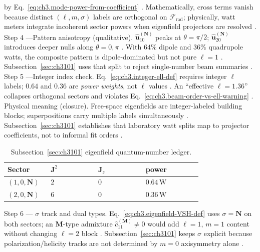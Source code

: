 by Eq.~\eqref{eq:ch3.mode-power-from-coefficient} \cite{poynting1884}. Mathematically, cross terms vanish
because distinct \((\ell,m,\sigma)\) labels are orthogonal on \(\mathcal{F}_{\mathrm{rad}}\); physically, watt meters integrate
incoherent sector powers when eigenfield projectors are resolved \cite{hansen1988}.
Step 4 ---Pattern anisotropy (qualitative). \(\widehat{\mathbf{u}}_{10}^{(\mathbf{N})}\) peaks at \(\theta=\pi/2\); \(\widehat{\mathbf{u}}_{20}^{(\mathbf{N})}\) introduces
deeper nulls along \(\theta=0,\pi\) \cite{jackson1999}. With \(64\%\) dipole and \(36\%\) quadrupole watts, the composite
pattern is dipole-dominated but not pure \(\ell=1\) \cite{harrington2001}. Subsection~\ref{sec:ch3101} uses that split to
reject single-number beam summaries \cite{harrington2001}.
Step 5 ---Integer index check. Eq.~\eqref{eq:ch3.integer-ell-def} requires integer \(\ell\) labels; \(0.64\) and \(0.36\) are \emph{power weights}, not \(\ell\) values
\cite{hansen1988}. An ``effective \(\ell=1.36\)'' collapses orthogonal sectors and violates
Eq.~\eqref{eq:ch3.beam-order-vs-ell-warning} \cite{stratton1941}.
Physical meaning (closure). Free-space eigenfields are integer-labeled building blocks; superpositions carry multiple labels simultaneously
\cite{jackson1999}. Subsection~\ref{sec:ch3101} establishes that laboratory watt splits map to projector
coefficients, not to informal fit orders \cite{harrington2001}.
\begin{table}[t]
\centering
\caption{Subsection~\ref{sec:ch3101} eigenfield quantum-number ledger.}
\label{tab:ch3.3101-quantum-ledger}
\small
\begin{tabular}{@{}p{0.20\linewidth}p{0.22\linewidth}p{0.22\linewidth}p{0.26\linewidth}@{}}
\toprule
Sector & \(\mathbf{J}^{2}\) & \(\mathbf{J}_{z}\) & power \\
\midrule
$(1,0,\mathbf{N})$ & $2$ & $0$ & $0.64\,\mathrm{W}$ \\
$(2,0,\mathbf{N})$ & $6$ & $0$ & $0.36\,\mathrm{W}$ \\
\bottomrule
\end{tabular}
\end{table}
Step 6 --- \(\sigma\) track and dual types. Eq.~\eqref{eq:ch3.eigenfield-VSH-def} uses \(\sigma=\mathbf{N}\) on both sectors; an \(\mathbf{M}\)-type admixture
\(\widehat{c}_{11}^{(\mathbf{M})}\neq0\) would add \(\ell=1\), \(m=1\) content without changing \(\ell=2\) block
\cite{belinfante1940}. Subsection~\ref{sec:ch3101} keeps \(\sigma\) explicit because polarization/helicity
tracks are not determined by \(m=0\) axisymmetry alone \cite{harrington2001}.
